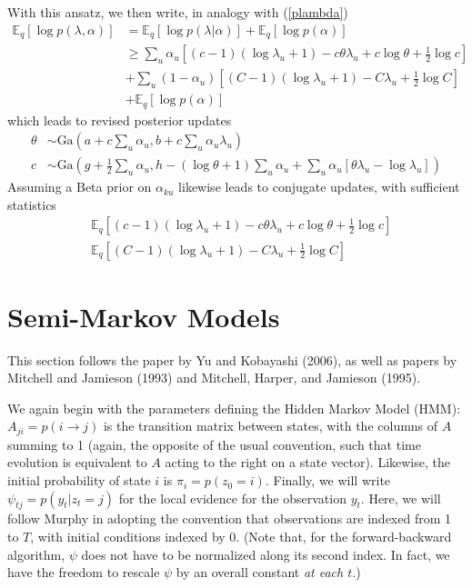 \documentclass[11pt]{article}
\begin{document}
With this ansatz, we then write, in analogy with (\ref{plambda})
\begin{align}
    \mathbb{E}_q [\log p(\lambda, \alpha)] &=
    \mathbb{E}_q[\log p(\lambda|\alpha)] + \mathbb{E}_q[\log p(\alpha)] \\
    &\ge \sum_u \alpha_u \left[
    (c - 1) (\log \lambda_u + 1) - c\theta\lambda_u + c \log \theta + \frac{1}{2}\log c\right] \\
    &+ \sum_u (1 - \alpha_u) \left[
        (C - 1)(\log \lambda_u + 1) - C\lambda_u + \frac{1}{2}\log C
     \right] \\
     &+ \mathbb{E}_q[\log p(\alpha)]
\end{align}
which leads to revised posterior updates
\begin{align}
    \theta &\sim \text{Ga}\left(a + c\sum_u \alpha_u, b + c\sum_u \alpha_u\lambda_u \right) \\
    c &\sim \text{Ga}\left(g + \frac{1}{2}\sum_u \alpha_u,
    h - (\log \theta + 1)\sum_u \alpha_u
    + \sum_u \alpha_u \left[ \theta \lambda_u - \log \lambda_u \right]\right)
\end{align}
Assuming a Beta prior on $\alpha_{ku}$ likewise leads to conjugate updates, with sufficient statistics
\begin{align}
    &\mathbb{E}_q \left[
        (c - 1) (\log \lambda_u + 1) - c\theta\lambda_u + c \log \theta + \frac{1}{2}\log c
    \right] \\
    &\mathbb{E}_q \left[
        (C - 1)(\log \lambda_u + 1) - C\lambda_u + \frac{1}{2}\log C
    \right]
\end{align}

\section{Semi-Markov Models}
This section follows the paper by Yu and Kobayashi (2006), as well as papers by Mitchell and Jamieson (1993) and Mitchell, Harper, and Jamieson (1995).

We again begin with the parameters defining the Hidden Markov Model (HMM): $A_{ji} = p({i \rightarrow j})$ is the transition matrix between states, with the columns of $A$ summing to 1 (again, the opposite of the usual convention, such that time evolution is equivalent to $A$ acting to the right on a state vector). Likewise, the initial probability of state $i$ is $\pi_i = p(z_0 = i)$. Finally, we will write $\psi_{tj} = p(y_t|z_t = j)$ for the local evidence for the observation $y_t$. Here, we will follow Murphy in adopting the convention that observations are indexed from 1 to $T$, with initial conditions indexed by 0. (Note that, for the forward-backward algorithm, $\psi$ does not have to be normalized along its second index. In fact, we have the freedom to rescale $\psi$ by an overall constant \emph{at each $t$}.)
\end{document}
